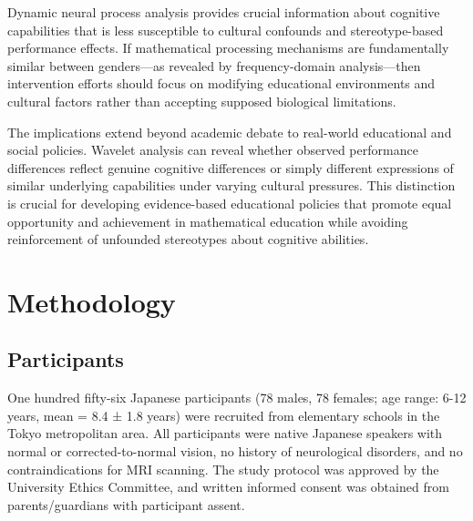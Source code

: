 \documentclass[12pt, a4paper]{article}
\begin{document}
Dynamic neural process analysis provides crucial information about cognitive capabilities that is less susceptible to cultural confounds and stereotype-based performance effects. If mathematical processing mechanisms are fundamentally similar between genders—as revealed by frequency-domain analysis—then intervention efforts should focus on modifying educational environments and cultural factors rather than accepting supposed biological limitations.

The implications extend beyond academic debate to real-world educational and social policies. Wavelet analysis can reveal whether observed performance differences reflect genuine cognitive differences or simply different expressions of similar underlying capabilities under varying cultural pressures. This distinction is crucial for developing evidence-based educational policies that promote equal opportunity and achievement in mathematical education while avoiding reinforcement of unfounded stereotypes about cognitive abilities.




\section{Methodology}
\subsection{Participants}
One hundred fifty-six Japanese participants (78 males, 78 females; age range: 6-12 years, mean = 8.4 ± 1.8 years) were recruited from elementary schools in the Tokyo metropolitan area. All participants were native Japanese speakers with normal or corrected-to-normal vision, no history of neurological disorders, and no contraindications for MRI scanning. The study protocol was approved by the University Ethics Committee, and written informed consent was obtained from parents/guardians with participant assent.
\end{document}
